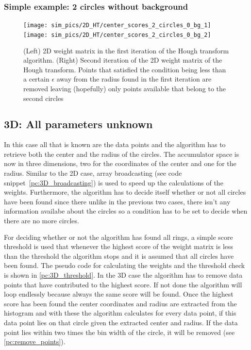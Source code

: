 \documentclass[11pt,twoside]{scrreprt}
\begin{document}

\subsubsection{Simple example: 2 circles without background} %
\label{ssub:simple_example_of_2_circles_without_background}
\begin{figure}[hp]
  \centering
  \texttt{[image: sim\_pics/2D\_HT/center\_scores\_2\_circles\_0\_bg\_1]}%
  \texttt{[image: sim\_pics/2D\_HT/center\_scores\_2\_circles\_0\_bg\_2]}

  \caption[2D weight matrix, first iteration]{(Left) 2D weight matrix in the first iteration of the Hough transform algorithm. (Right) Second iteration
  of the 2D weight matrix of the Hough transform. Points that satisfied the condition being less than a certain $\epsilon$ away from the radius found in the first iteration are removed leaving (hopefully) only points available that belong to the second circles}
  \label{fig:2d_weights_01}
\end{figure}

\subsection{3D: All parameters unknown} %
\label{sub:3d_nothing_is_known_find_everything}
In this case all that is known are the data points and the algorithm has to retrieve both the center and the radius of the circles. 
The accumulator space is now in three dimensions, two for the coordinates of the center and one for the radius. Similar to the 2D case, 
array broadcasting (see code snippet~\ref{pc:3D_broadcasting}) is used to speed up the calculations of the weights. Furthermore, 
the algorithm has to decide itself whether or not  all circles have been found since there unlike in the previous two cases, there isn't 
any information availabe about the circles so a condition has to be set to decide when there are no more circles.

For deciding whether or not the algorithm has found all rings, a simple score threshold is used that whenever the highest score
of the weight matrix is less than the threshold the algorithm stops and it is assumed that all circles have been found. The pseudo
code for calculating the weights and the threshold check is shown in \ref{pc:3D_threshold}. In the 3D case the algorithm has to 
remove data points that have contributed to the highest score. If not done the algorithm will loop endlessly because always the
same score will be found. Once the highest score has been found the center coordinates and radius are extracted from the histogram and 
with these the algorithm calculates for every data point, if this data point lies on that circle given the extracted center and radius.
If the data point lies within two times the bin width of the circle, it will be removed (see \ref{pc:remove_points}).
\end{document}
